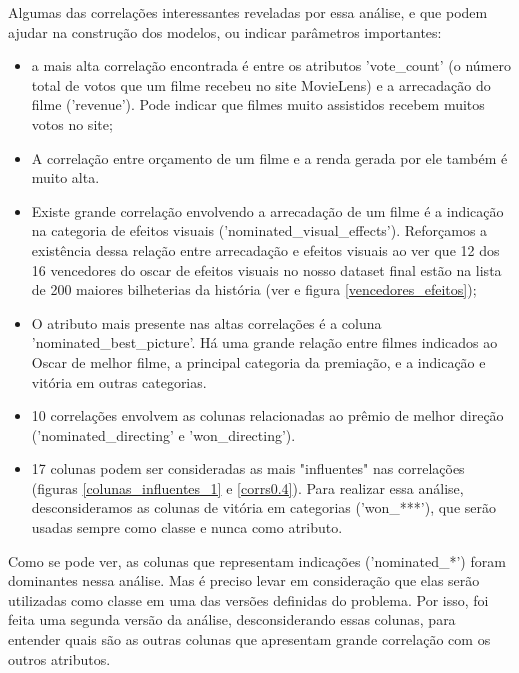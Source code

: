             Algumas das correlações interessantes reveladas por essa análise, e que podem ajudar na construção dos modelos, ou indicar parâmetros importantes:

            \begin{itemize}

            \item a mais alta correlação encontrada é entre os atributos 'vote\_count' (o número total de votos que um filme recebeu no site MovieLens) e a arrecadação do filme ('revenue'). Pode indicar que filmes muito assistidos recebem muitos votos no site;
            
            \item A correlação entre orçamento de um filme e a renda gerada por ele também é muito alta.

            \item Existe grande correlação envolvendo a arrecadação de um filme é a indicação na categoria de efeitos visuais ('nominated\_visual\_effects'). Reforçamos a existência dessa relação entre arrecadação e efeitos visuais ao ver que 12 dos 16 vencedores do oscar de efeitos visuais no nosso dataset final estão na lista de 200 maiores bilheterias da história (ver  e figura \ref{vencedores_efeitos});

            \item O atributo mais presente nas altas correlações é a coluna 'nominated\_best\_picture'. Há uma grande relação entre filmes indicados ao Oscar de melhor filme, a principal categoria da premiação, e a indicação e vitória em outras categorias.

            \item 10 correlações envolvem as colunas relacionadas ao prêmio de melhor direção ('nominated\_directing' e 'won\_directing').

            \item 17 colunas podem ser consideradas as mais "influentes" nas correlações (figuras \ref{colunas_influentes_1} e \ref{corrs0.4}). Para realizar essa análise, desconsideramos as colunas de vitória em categorias ('won\_***'), que serão usadas sempre como classe e nunca como atributo.
            
            \end{itemize}
            
            Como se pode ver, as colunas que representam indicações ('nominated\_*') foram dominantes nessa análise. Mas é preciso levar em consideração que elas serão utilizadas como classe em uma das versões definidas do problema. Por isso, foi feita uma segunda versão da análise, desconsiderando essas colunas, para entender quais são as outras colunas que apresentam grande correlação com os outros atributos.
            
